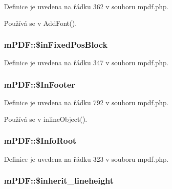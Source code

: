 Definice je uvedena na řádku 362 v souboru mpdf.\-php.



Používá se v Add\-Font().

\hypertarget{classm_p_d_f_a630952d096c2f17e2e81cf2b1e5510ee}{
\subsubsection[{\$in\-Fixed\-Pos\-Block}]{\setlength{\rightskip}{0pt plus 5cm}m\-P\-D\-F\-::\$in\-Fixed\-Pos\-Block}}\label{classm_p_d_f_a630952d096c2f17e2e81cf2b1e5510ee}


Definice je uvedena na řádku 347 v souboru mpdf.\-php.

\hypertarget{classm_p_d_f_a517528690e5aa048b1fd2af8bdddb451}{
\subsubsection[{\$\-In\-Footer}]{\setlength{\rightskip}{0pt plus 5cm}m\-P\-D\-F\-::\$\-In\-Footer}}\label{classm_p_d_f_a517528690e5aa048b1fd2af8bdddb451}


Definice je uvedena na řádku 792 v souboru mpdf.\-php.



Používá se v inline\-Object().

\hypertarget{classm_p_d_f_ac45bd52cd9f2ff6104a212ddf669129e}{
\subsubsection[{\$\-Info\-Root}]{\setlength{\rightskip}{0pt plus 5cm}m\-P\-D\-F\-::\$\-Info\-Root}}\label{classm_p_d_f_ac45bd52cd9f2ff6104a212ddf669129e}


Definice je uvedena na řádku 323 v souboru mpdf.\-php.

\hypertarget{classm_p_d_f_ad05e3337849adc4c251ca8768dc290da}{
\subsubsection[{\$inherit\-\_\-lineheight}]{\setlength{\rightskip}{0pt plus 5cm}m\-P\-D\-F\-::\$inherit\-\_\-lineheight}}\label{classm_p_d_f_ad05e3337849adc4c251ca8768dc290da}


